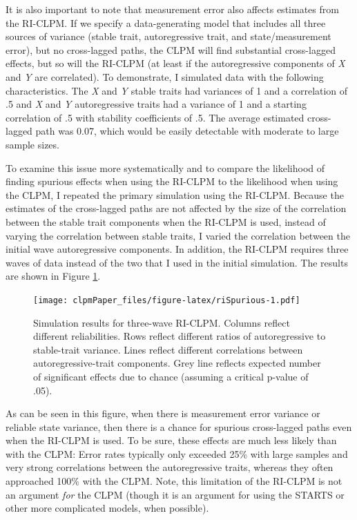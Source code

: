 \documentclass[
  english,
  man,floatsintext]{apa6}
\begin{document}
It is also important to note that measurement error also affects estimates from the RI-CLPM. If we specify a data-generating model that includes all three sources of variance (stable trait, autoregressive trait, and state/measurement error), but no cross-lagged paths, the CLPM will find substantial cross-lagged effects, but so will the RI-CLPM (at least if the autoregressive components of \emph{X} and \emph{Y} are correlated). To demonstrate, I simulated data with the following characteristics. The \emph{X} and \emph{Y} stable traits had variances of 1 and a correlation of .5 and \emph{X} and \emph{Y} autoregressive traits had a variance of 1 and a starting correlation of .5 with stability coefficients of .5. The average estimated cross-lagged path was 0.07, which would be easily detectable with moderate to large sample sizes.

To examine this issue more systematically and to compare the likelihood of finding spurious effects when using the RI-CLPM to the likelihood when using the CLPM, I repeated the primary simulation using the RI-CLPM. Because the estimates of the cross-lagged paths are not affected by the size of the correlation between the stable trait components when the RI-CLPM is used, instead of varying the correlation between stable traits, I varied the correlation between the initial wave autoregressive components. In addition, the RI-CLPM requires three waves of data instead of the two that I used in the initial simulation. The results are shown in Figure \ref{fig:riSpurious}.

\begin{figure}
\centering
\texttt{[image: clpmPaper\_files/figure-latex/riSpurious-1.pdf]}
\caption{\label{fig:riSpurious}Simulation results for three-wave RI-CLPM. Columns reflect different reliabilities. Rows reflect different ratios of autoregressive to stable-trait variance. Lines reflect different correlations between autoregressive-trait components. Grey line reflects expected number of significant effects due to chance (assuming a critical p-value of .05).}
\end{figure}

As can be seen in this figure, when there is measurement error variance or reliable state variance, then there is a chance for spurious cross-lagged paths even when the RI-CLPM is used. To be sure, these effects are much less likely than with the CLPM: Error rates typically only exceeded 25\% with large samples and very strong correlations between the autoregressive traits, whereas they often approached 100\% with the CLPM. Note, this limitation of the RI-CLPM is not an argument \emph{for} the CLPM (though it is an argument for using the STARTS or other more complicated models, when possible).
\end{document}
